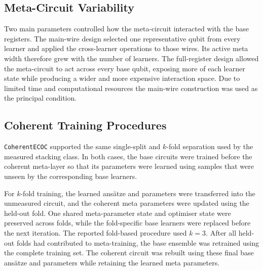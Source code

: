 \documentclass[]{UCD_CS_MSc_AAI_Report}
\begin{document}
\subsection{Meta-Circuit Variability}
Two main parameters controlled how the meta-circuit interacted with the base registers. The main-wire design selected one representative qubit from every learner and applied the cross-learner operations to those wires. Its active meta width therefore grew with the number of learners. The full-register design allowed the meta-circuit to act across every base qubit, exposing more of each learner state while producing a wider and more expensive interaction space. Due to limited time and computational resources the main-wire construction was used as the principal condition.



\subsection{Coherent Training Procedures}

\texttt{CoherentECOC} supported the same single-split and $k$-fold separation used by the measured stacking class. In both cases, the base circuits were trained before the coherent meta-layer so that its parameters were learned using samples that were unseen by the corresponding base learners.

For $k$-fold training, the learned ansätze and parameters were transferred into the unmeasured circuit, and the coherent meta parameters were updated using the held-out fold. One shared meta-parameter state and optimiser state were preserved across folds, while the fold-specific base learners were replaced before the next iteration. The reported fold-based procedure used $k=3$. After all held-out folds had contributed to meta-training, the base ensemble was retrained using the complete training set. The coherent circuit was rebuilt using these final base ansätze and parameters while retaining the learned meta parameters.
\end{document}
